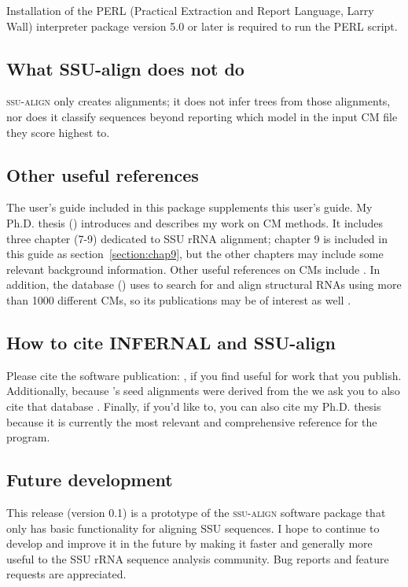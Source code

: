 Installation of the PERL (Practical Extraction and Report Language,
Larry Wall) interpreter package version 5.0 or later is required to
run the  PERL script.

\subsection{What SSU-align does not do}

\textsc{ssu-align} only creates alignments; it does not infer trees
from those alignments, nor does it classify sequences beyond reporting
which model in the input CM file they score highest to.

\subsection{Other useful references}

The  user's guide \cite{infernalguide} included in
this package supplements this user's guide. My Ph.D. thesis 
()
introduces and describes my work on CM methods. It includes three chapter (7-9) dedicated to
SSU rRNA alignment; chapter 9 is included in this guide as
section~\ref{section:chap9}, but the other chapters may include some
relevant background information. 
Other useful references on CMs include
\cite{Eddy94,Eddy02b,NawrockiEddy07,Nawrocki09,KolbeEddy09}. In
addition, the  database 
()
uses  to search for and align
structural RNAs using more than 1000 different CMs, so its
publications may be of interest as well
\cite{Griffiths-Jones03,Griffiths-Jones05,Gardner09}.

\subsection{How to cite INFERNAL and SSU-align}

Please cite the  software publication:
\cite{Nawrocki09}, if you find  useful for work that
you publish. Additionally, because 's seed alignments were
derived from the  we ask you to also cite
that database \cite{CannoneGutell02}.  Finally, if you'd like to, you
can also cite my Ph.D. thesis \cite{Nawrocki09b} because it is
currently the most relevant and comprehensive reference for the
program.

\subsection{Future development}

This release (version 0.1) is a prototype of the \textsc{ssu-align}
software package that only has basic functionality for aligning SSU
sequences. I hope to continue to develop and improve it in the future
by making it faster and generally more useful to the SSU rRNA sequence
analysis community. Bug reports and feature requests are appreciated.
